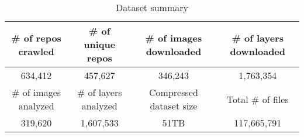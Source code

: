 
\begin{table*}
	\centering
	\caption{Dataset summary} \label{tab-dataset-summary}
	\begin{tabular}{c|c|c|c}%
		\# of repos crawled & \# of unique repos & \# of images downloaded  & \# of layers downloaded \\
		\hline
		634,412                 & 457,627                 & 346,243                    & 1,763,354  \\
		\hline
		\hline
		\# of images analyzed & \# of layers analyzed & Compressed dataset size              &  Total \# of files \\
		\hline
		319,620                     & 1,607,533                     & 51TB                        & 117,665,791  \\
		\hline
	\end{tabular}
\end{table*}

